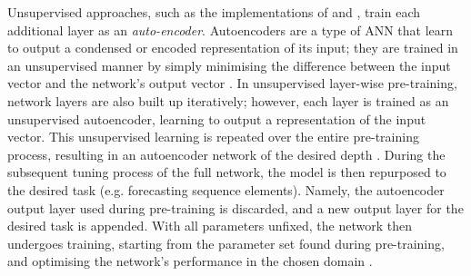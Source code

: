 \documentclass[a4paper, 11pt]{report}
\begin{document}
    Unsupervised approaches, such as the implementations of \citet{xu-2018} and \citet{sagheer-2019}, train each additional layer as an \emph{auto-encoder}. Autoencoders are a type of ANN that learn to output a condensed or encoded representation of its input; they are trained in an unsupervised manner by simply minimising the difference between the input vector and the network's output vector \citep{pinaya-2019}. In unsupervised layer-wise pre-training, network layers are also built up iteratively; however, each layer is trained as an unsupervised autoencoder, learning to output a representation of the input vector. This unsupervised learning is repeated over the entire pre-training process, resulting in an autoencoder network of the desired depth \citep{sagheer-2019}. During the subsequent tuning process of the full network, the model is then repurposed to the desired task (e.g. forecasting sequence elements). Namely, the autoencoder output layer used during pre-training is discarded, and a new output layer for the desired task is appended. With all parameters unfixed, the network then undergoes training, starting from the parameter set found during pre-training, and optimising the network's performance in the chosen domain \citep{sagheer-2019}.
\end{document}

